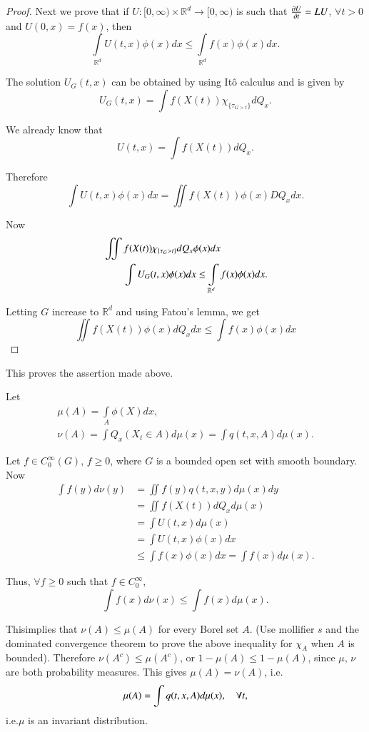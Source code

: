 \begin{proof}
Next we prove that if $U:[0,\infty)\times \mathbb{R}^{d}\to
  [0,\infty)$ is such that $\frac{\partial U}{\partial t}=LU$, $\forall t>0$ and
    $U(0,x)=f(x)$, then
$$
\int\limits_{\mathbb{R}^{d}}U(t,x)\phi(x)dx\leq
\int\limits_{\mathbb{R}^{d}}f(x)\phi(x)dx. 
$$

The solution $U_{G}(t,x)$ can be obtained by using It\^o calculus and
is given by
$$
U_{G}(t,x)=\int f(X(t))\chi_{\{\tau_{G>t}\}}dQ_{x}.
$$

We already know that
$$
U(t,x)=\int f(X(t))dQ_{x}.
$$

Therefore
$$
\int U(t,x)\phi(x)dx=\iint f(X(t))\phi(x)DQ_{x}dx.
$$

Now 
\begin{align*}
& \iint f(X(t))\chi_{\{\tau_{G}>t\}}dQ_{x}\phi(x)dx\\
&\qquad \int U_{G}(t,x)\phi(x)dx\leq \int\limits_{\mathbb{R}^{d}}f(x)\phi(x)dx.
\end{align*}\pageoriginale

Letting $G$ increase to $\mathbb{R}^{d}$ and using Fatou's lemma, we
get
$$
\iint f(X(t))\phi(x)dQ_{x}dx\leq \int f(x)\phi(x)dx
$$
\end{proof}

This proves the assertion made above.

Let
\begin{gather*}
\mu(A)=\int\limits_{A}\phi(X)dx,\\
\nu(A)=\int Q_{x}(X_{t}\in A)d\mu(x)=\int q(t,x,A)d\mu(x).
\end{gather*}

Let $f\in C^{\infty}_{0}(G)$, $f\geq 0$, where $G$ is a bounded open
set with smooth boundary. Now
\begin{align*}
\int f(y)d\nu(y) &= \iint f(y)q(t,x,y)d\mu(x)dy\\
&= \iint f(X(t))dQ_{x}d\mu(x)\\
&= \int U(t,x)d\mu(x)\\
&= \int U(t,x)\phi(x)dx\\
&\leq \int f(x)\phi(x)dx=\int f(x)d\mu (x).
\end{align*}

Thus, $\forall f\geq 0$ such that $f\in C^{\infty}_{0}$,
$$
\int f(x)d\nu(x)\leq \int f(x)d\mu(x).
$$

This\pageoriginale implies that $\nu(A)\leq \mu(A)$ for every Borel
set $A$. (Use mollifier $s$ and the dominated convergence theorem to
prove the above inequality for $\chi_{A}$ when $A$ is
bounded). Therefore $\nu(A^{c})\leq \mu(A^{c})$, or $1-\mu(A)\leq
1-\mu(A)$, since $\mu$, $\nu$ are both probability measures. This
gives $\mu(A)=\nu(A)$, i.e.
$$
\mu(A)=\int q(t,x,A)d\mu(x),\quad \forall t,
$$
i.e.\@ $\mu$ is an invariant distribution.

